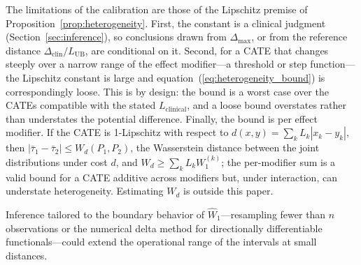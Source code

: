 \documentclass[AMA,Times1COL]{WileyNJDv5}
\begin{document}
The limitations of the calibration are those of the Lipschitz premise of Proposition~\ref{prop:heterogeneity}. First, the constant is a clinical judgment (Section~\ref{sec:inference}), so conclusions drawn from $\Delta_{\max}$, or from the reference distance $\Delta_{\text{clin}} / L_{\text{UB}}$, are conditional on it. Second, for a CATE that changes steeply over a narrow range of the effect modifier---a threshold or step function---the Lipschitz constant is large and equation~(\ref{eq:heterogeneity_bound}) is correspondingly loose. This is by design: the bound is a worst case over the CATEs compatible with the stated $L_{\text{clinical}}$, and a loose bound overstates rather than understates the potential difference. %
Finally, the bound is per effect modifier. If the CATE is 1-Lipschitz with respect to $d(x, y) = \sum_k L_k |x_k - y_k|$, then $|\bar{\tau}_1 - \bar{\tau}_2| \leq W_d(P_1, P_2)$, the Wasserstein distance between the joint distributions under cost $d$, and $W_d \geq \sum_k L_k W_1^{(k)}$; the per-modifier sum is a valid bound for a CATE additive across modifiers but, under interaction, can understate heterogeneity. Estimating $W_d$ is outside this paper.

Inference tailored to the boundary behavior of $\widehat{W}_1$---resampling fewer than $n$ observations\cite{bickel1997} or the numerical delta method for directionally differentiable functionals\cite{hong2018}---could extend the operational range of the intervals at small distances.
\end{document}
